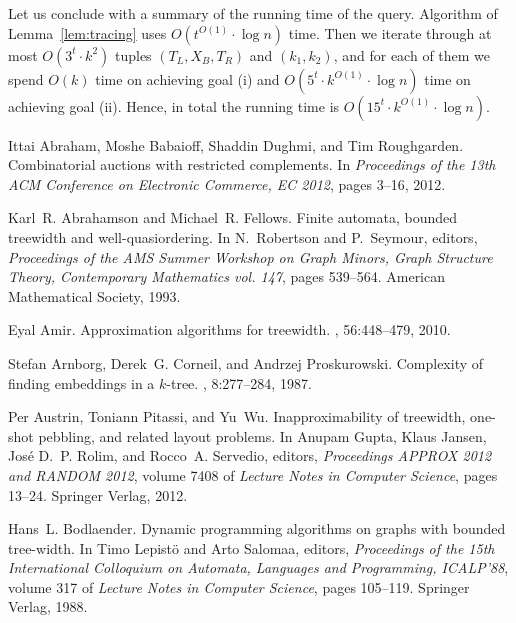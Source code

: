 \documentclass[a4paper,11pt]{article}
\theoremstyle{definition}
\theoremstyle{remark}
\begin{document}
Let us conclude with a summary of the running time of the query.
Algorithm of Lemma~\ref{lem:tracing} uses $O(t^{O(1)}\cdot \log n)$
time.  Then we iterate through at most $O(3^t\cdot k^2)$ tuples
$(T_L,X_B,T_R)$ and $(k_1,k_2)$, and for each of them we spend $O(k)$
time on achieving goal (i) and $O(5^t\cdot k^{O(1)}\cdot \log n)$ time
on achieving goal (ii).  Hence, in total the running time is
$O(15^t\cdot k^{O(1)}\cdot \log n)$.



\begin{thebibliography}{10}

Ittai Abraham, Moshe Babaioff, Shaddin Dughmi, and Tim Roughgarden.
\newblock Combinatorial auctions with restricted complements.
\newblock In {\em Proceedings of the 13th ACM Conference on Electronic
  Commerce, EC 2012}, pages 3--16, 2012.

Karl~R. Abrahamson and Michael~R. Fellows.
\newblock Finite automata, bounded treewidth and well-quasiordering.
\newblock In N.~Robertson and P.~Seymour, editors, {\em Proceedings of the AMS
  Summer Workshop on Graph Minors, Graph Structure Theory, Contemporary
  Mathematics vol. 147}, pages 539--564. American Mathematical Society, 1993.

Eyal Amir.
\newblock Approximation algorithms for treewidth.
, 56:448--479, 2010.

Stefan Arnborg, Derek~G. Corneil, and Andrzej Proskurowski.
\newblock Complexity of finding embeddings in a $k$-tree.
, 8:277--284,
  1987.

Per Austrin, Toniann Pitassi, and Yu~Wu.
\newblock Inapproximability of treewidth, one-shot pebbling, and related layout
  problems.
\newblock In Anupam Gupta, Klaus Jansen, Jos{\'e} D.~P. Rolim, and Rocco~A.
  Servedio, editors, {\em Proceedings APPROX 2012 and RANDOM 2012}, volume 7408
  of {\em Lecture Notes in Computer Science}, pages 13--24. Springer Verlag,
  2012.

Hans~L. Bodlaender.
\newblock Dynamic programming algorithms on graphs with bounded tree-width.
\newblock In Timo Lepist\"{o} and Arto Salomaa, editors, {\em Proceedings of
  the 15th International Colloquium on Automata, Languages and Programming,
  ICALP'88}, volume 317 of {\em Lecture Notes in Computer Science}, pages
  105--119. Springer Verlag, 1988.


\end{thebibliography}
\end{document}
